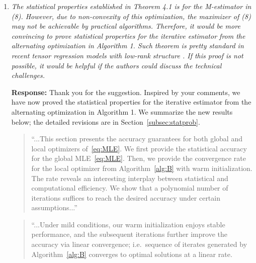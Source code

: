 \documentclass[11pt]{article}
\theoremstyle{plain}
\theoremstyle{definition}
\begin{document}
\begin{enumerate}[wide, labelwidth=!, labelindent=0pt]
    \item \textit{The statistical properties established in Theorem 4.1 is for the M-estimator in (8). However, due to non-convexity of this optimization, the maximizer of (8) may not be achievable by practical algorithms. Therefore, it would be more convincing to prove statistical properties for the iterative estimator from the alternating optimization in Algorithm 1. Such theorem is pretty standard in recent tensor regression models with low-rank structure \citep{sun2017store, raskutti2019convex,hao2019sparse,han2020optimal}. If this proof is not possible, it would be helpful if the authors could discuss the technical challenges.}
  
    
    {\bf Response: }Thank you for the suggestion. Inspired by your comments, we have now proved the statistical properties for the iterative estimator from the alternating optimization in Algorithm 1. We summarize the new results below; the detailed revisions are in Section~\ref{subsec:statprob}. 
    
     \begin{quote}
    ``...This section presents the accuracy guarantees for both global and local optimizers of~\eqref{eq:MLE}. We first provide the statistical accuracy for the global MLE~\eqref{eq:MLE}. Then, we provide the convergence rate for the local optimizer from Algorithm~\ref{alg:B} with warm initialization. The rate reveals an interesting interplay between statistical and computational efficiency. We show that a polynomial number of iterations suffices to reach the desired accuracy under certain assumptions...'' 
    \end{quote}
    
     \begin{quote}
``...Under mild conditions, our warm initialization enjoys stable performance, and the subsequent iterations further improve the accuracy via linear convergence; i.e.\ sequence of iterates generated by Algorithm~\ref{alg:B} converges to optimal solutions at a linear rate. 


\end{quote}
\end{enumerate}
\end{document}
